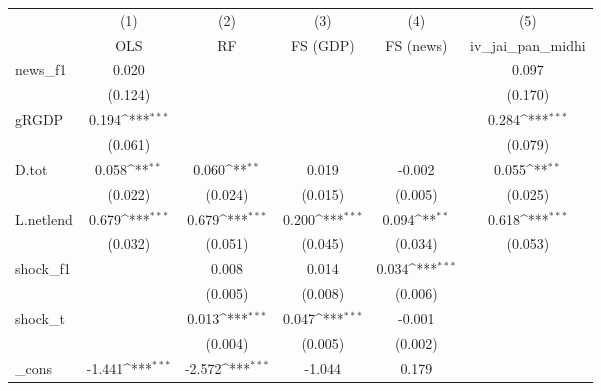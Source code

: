 {
\def\sym#1{\ifmmode^{#1}\else\(^{#1}\)\fi}
\begin{tabular}{l*{5}{c}}
\toprule
            &\multicolumn{1}{c}{(1)}&\multicolumn{1}{c}{(2)}&\multicolumn{1}{c}{(3)}&\multicolumn{1}{c}{(4)}&\multicolumn{1}{c}{(5)}\\
            &\multicolumn{1}{c}{OLS}&\multicolumn{1}{c}{RF}&\multicolumn{1}{c}{FS (GDP)}&\multicolumn{1}{c}{FS (news)}&\multicolumn{1}{c}{iv\_jai\_pan\_midhi}\\
\midrule
news\_f1     &       0.020         &                     &                     &                     &       0.097         \\
            &     (0.124)         &                     &                     &                     &     (0.170)         \\
\addlinespace
gRGDP       &       0.194\sym{***}&                     &                     &                     &       0.284\sym{***}\\
            &     (0.061)         &                     &                     &                     &     (0.079)         \\
\addlinespace
D.tot       &       0.058\sym{**} &       0.060\sym{**} &       0.019         &      -0.002         &       0.055\sym{**} \\
            &     (0.022)         &     (0.024)         &     (0.015)         &     (0.005)         &     (0.025)         \\
\addlinespace
L.netlend   &       0.679\sym{***}&       0.679\sym{***}&       0.200\sym{***}&       0.094\sym{**} &       0.618\sym{***}\\
            &     (0.032)         &     (0.051)         &     (0.045)         &     (0.034)         &     (0.053)         \\
\addlinespace
shock\_f1    &                     &       0.008         &       0.014         &       0.034\sym{***}&                     \\
            &                     &     (0.005)         &     (0.008)         &     (0.006)         &                     \\
\addlinespace
shock\_t     &                     &       0.013\sym{***}&       0.047\sym{***}&      -0.001         &                     \\
            &                     &     (0.004)         &     (0.005)         &     (0.002)         &                     \\
\addlinespace
\_cons      &      -1.441\sym{***}&      -2.572\sym{***}&      -1.044         &       0.179         &                     \\

\end{tabular}}
